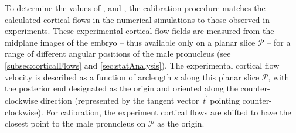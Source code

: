 To determine the values of \hydrodynamicLength, \nematicLength and \activeRelaxLength, the calibration procedure matches the calculated cortical flows in the numerical simulations to those observed in experiments. These experimental cortical flow fields are measured from the midplane images of the embryo -- thus available only on a planar slice $\mathcal{P}$ -- for a range of different angular positions of the male pronucleus (see \autoref{subsec:corticalFlows} and \autoref{sec:statAnalysis}). The experimental cortical flow velocity is described as a function of arclength $s$ along this planar slice $\mathcal{P}$, with the posterior end designated as the origin and oriented along the counter-clockwise direction (represented by the tangent vector $\vec{t}$ pointing counter-clockwise). For calibration, the experiment cortical flows are shifted to have the closest point to the male pronucleus on $\mathcal{P}$ as the origin.

